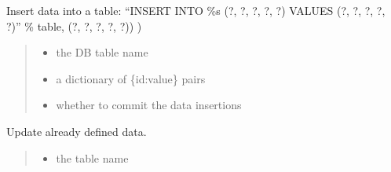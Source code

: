 \documentclass[letterpaper,12pt,english]{sphinxmanual}
\begin{document}
\begin{fulllineitems}
\begin{fulllineitems}
\label{\detokenize{api/networking:cbmpy.CBNetDB.DBTools.insertData}}
\pysigstartsignatures
\pysiglinewithargsret
{}
{\sphinxparamcomma {}\sphinxparamcomma {}}
{}
\pysigstopsignatures
\sphinxAtStartPar
Insert data into a table: “INSERT INTO \%s (?, ?, ?, ?, ?) VALUES (?, ?, ?, ?, ?)” \% table, (?, ?, ?, ?, ?)) )
\begin{quote}\begin{description}
\begin{itemize}
\item {} 
\sphinxAtStartPar
{} \textendash{} the DB table name

\item {} 
\sphinxAtStartPar
{} \textendash{} a dictionary of \{id:value\} pairs

\item {} 
\sphinxAtStartPar
{} \textendash{} whether to commit the data insertions

\end{itemize}

\end{description}\end{quote}

\end{fulllineitems}


\begin{fulllineitems}
\label{\detokenize{api/networking:cbmpy.CBNetDB.DBTools.updateData}}
\pysigstartsignatures
\pysiglinewithargsret
{}
{\sphinxparamcomma {}\sphinxparamcomma {}\sphinxparamcomma {}\sphinxparamcomma {}}
{}
\pysigstopsignatures
\sphinxAtStartPar
Update already defined data.
\begin{quote}\begin{description}
\begin{itemize}
\item {} 
\sphinxAtStartPar
{} \textendash{} the table name


\end{itemize}
\end{description}
\end{quote}
\end{fulllineitems}
\end{fulllineitems}
\end{document}
